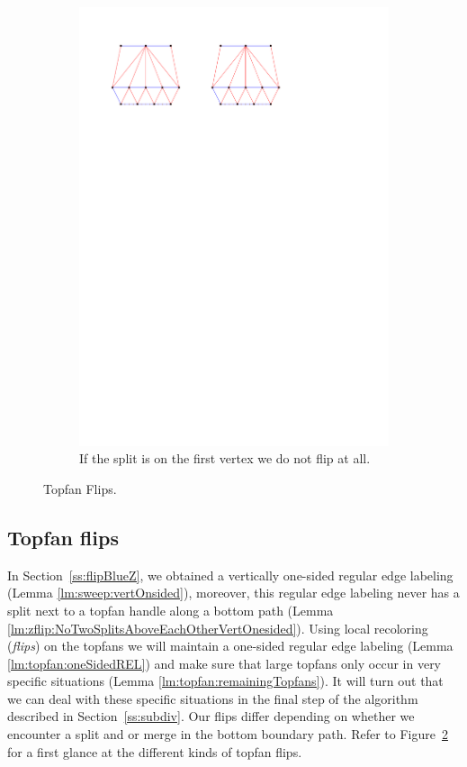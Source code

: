 \begin{figure}[!b]
\begin{subfigure}[b]{0.45 \textwidth}
        \includegraphics[width =\textwidth]{topFanFlips/img/splitfront}
        \caption{If the split is on the first vertex we do not flip at all.}
        \label{fig:fanflip:splitFirstVertex}
    \end{subfigure}

    \caption{Topfan Flips.}
    \label{fig:fanflip:fanflips}
\end{figure}

\subsection{Topfan flips}
\thispagestyle{plain}
\label{ss:fanflip}

In Section~\ref{ss:flipBlueZ}, we obtained a vertically one-sided regular edge labeling (Lemma \ref{lm:sweep:vertOnsided}), moreover, this regular edge labeling never has a split next to a topfan handle along a bottom path (Lemma \ref{lm:zflip:NoTwoSplitsAboveEachOtherVertOnesided}).
Using local recoloring (\emph{flips}) on the topfans we will maintain a one-sided regular edge labeling (Lemma \ref{lm:topfan:oneSidedREL}) and make sure that large topfans only occur in very specific situations (Lemma \ref{lm:topfan:remainingTopfans}). It will turn out that we can deal with these specific situations in the final step of the algorithm described in Section~\ref{ss:subdiv}.
Our flips differ depending on whether we encounter a split and or merge in the bottom boundary path.
Refer to Figure~\ref{fig:fanflip:fanflips} for a first glance at the different kinds of topfan flips.


